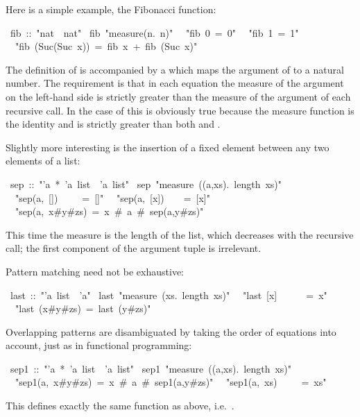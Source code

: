 \begin{isabelle}%
%
\begin{isamarkuptext}%
Here is a simple example, the Fibonacci function:%
\end{isamarkuptext}%
~fib~::~{"}nat~{\isasymRightarrow}~nat{"}\isanewline
{}~fib~{"}measure({\isasymlambda}n.~n){"}\isanewline
~~{"}fib~0~=~0{"}\isanewline
~~{"}fib~1~=~1{"}\isanewline
~~{"}fib~(Suc(Suc~x))~=~fib~x~+~fib~(Suc~x){"}%
\begin{isamarkuptext}%
\noindent
The definition of  is accompanied by a 
 which maps the argument of  to a
natural number. The requirement is that in each equation the measure of the
argument on the left-hand side is strictly greater than the measure of the
argument of each recursive call. In the case of  this is
obviously true because the measure function is the identity and
 is strictly greater than both  and
.

Slightly more interesting is the insertion of a fixed element
between any two elements of a list:%
\end{isamarkuptext}%
~sep~::~{"}'a~*~'a~list~{\isasymRightarrow}~'a~list{"}\isanewline
{}~sep~{"}measure~({\isasymlambda}(a,xs).~length~xs){"}\isanewline
~~{"}sep(a,~[])~~~~~=~[]{"}\isanewline
~~{"}sep(a,~[x])~~~~=~[x]{"}\isanewline
~~{"}sep(a,~x\#y\#zs)~=~x~\#~a~\#~sep(a,y\#zs){"}%
\begin{isamarkuptext}%
\noindent
This time the measure is the length of the list, which decreases with the
recursive call; the first component of the argument tuple is irrelevant.

Pattern matching need not be exhaustive:%
\end{isamarkuptext}%
~last~::~{"}'a~list~{\isasymRightarrow}~'a{"}\isanewline
{}~last~{"}measure~({\isasymlambda}xs.~length~xs){"}\isanewline
~~{"}last~[x]~~~~~~=~x{"}\isanewline
~~{"}last~(x\#y\#zs)~=~last~(y\#zs){"}%
\begin{isamarkuptext}%
Overlapping patterns are disambiguated by taking the order of equations into
account, just as in functional programming:%
\end{isamarkuptext}%
~sep1~::~{"}'a~*~'a~list~{\isasymRightarrow}~'a~list{"}\isanewline
{}~sep1~{"}measure~({\isasymlambda}(a,xs).~length~xs){"}\isanewline
~~{"}sep1(a,~x\#y\#zs)~=~x~\#~a~\#~sep1(a,y\#zs){"}\isanewline
~~{"}sep1(a,~xs)~~~~~=~xs{"}%
\begin{isamarkuptext}%
\noindent
This defines exactly the same function as  above, i.e.\
.


\end{isamarkuptext}
\end{isabelle}
